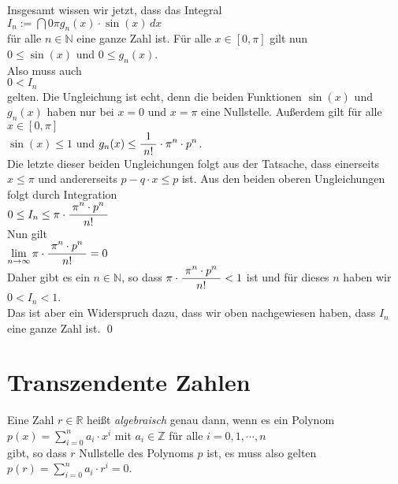 Insgesamt wissen wir jetzt, dass das Integral
\\[0.2cm]
\hspace*{1.3cm}
$I_n := \dint{0}{{\pi}} g_n(x) \cdot \sin(x)\, dx$
\\[0.2cm]
f\"ur alle $n \in \mathbb{N}$ eine ganze Zahl ist.  F\"ur alle $x \in [0, \pi]$ gilt nun
\\[0.2cm]
\hspace*{1.3cm}
$0 \leq \sin(x)$ \quad und \quad $0 \leq g_n(x)$.
\\[0.2cm]
Also muss auch
\\[0.2cm]
\hspace*{1.3cm}
$0 < I_n$
\\[0.2cm]
gelten.  Die Ungleichung ist echt, denn die beiden Funktionen $\sin(x)$ und $g_n(x)$ haben
nur bei $x = 0$ und $x = \pi$ eine Nullstelle.
Au{\ss}erdem gilt f\"ur alle $x \in [0,\pi]$
\\[0.2cm]
\hspace*{1.3cm}
$\sin(x) \leq 1$ \quad und \quad $g_n(x) \leq \displaystyle\frac{\;\displaystyle1\;}{\;\displaystyle n!\;} \cdot \pi^n \cdot p^n$.
\\[0.2cm]
Die letzte dieser beiden Ungleichungen folgt aus der Tatsache, dass einerseits $x \leq \pi$ und andererseits
$p - q\cdot x \leq p$ ist.  Aus den beiden oberen Ungleichungen folgt durch Integration
\\[0.2cm]
\hspace*{1.3cm}
$0 \leq I_n \leq \pi \cdot \displaystyle\frac{\;\displaystyle\pi^n \cdot p^n\;}{\;\displaystyle n!\;}$
\\[0.2cm]
Nun gilt
\\[0.2cm]
\hspace*{1.3cm}
$\lim\limits_{n \rightarrow \infty} \pi \cdot \displaystyle\frac{\;\displaystyle\pi^n \cdot p^n\;}{\;\displaystyle n!\;} = 0$
\\[0.2cm]
Daher gibt es ein $n \in \mathbb{N}$, so dass $\pi \cdot \displaystyle\frac{\;\displaystyle\pi^n \cdot p^n\;}{\;\displaystyle n!\;} < 1$ ist und f\"ur dieses
$n$ haben wir 
\\[0.2cm]
\hspace*{1.3cm}
$0 < I_n < 1$.
\\[0.2cm]
Das ist aber ein Widerspruch dazu, dass wir oben nachgewiesen haben, dass $I_n$ eine ganze Zahl ist.  \qed

\section{Transzendente Zahlen}
\begin{Definition} \lb
Eine Zahl $r \in \mathbb{R}$ hei{\ss}t \emph{algebraisch} genau dann, wenn es ein Polynom
\\[0.2cm]
\hspace*{1.3cm}
$p(x) = \sum\limits_{i=0}^n a_i \cdot x^i$  \quad mit $a_i \in \mathbb{Z}$ f\"ur alle $i = 0, 1, \cdots, n$
\\[0.2cm]
gibt, so dass $r$ Nullstelle des Polynoms $p$ ist, es muss also gelten
\\[0.2cm]
\hspace*{1.3cm}
$p(r) = \sum\limits_{i=0}^n a_i \cdot r^i = 0$.  \eod
\end{Definition}

